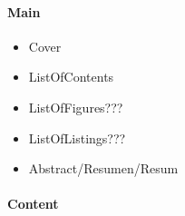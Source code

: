 \paragraph{Main}

\begin{itemize}
	\item Cover
	\item ListOfContents
	\item ListOfFigures???
	\item ListOfListings???
	\item Abstract/Resumen/Resum
\end{itemize} 

\paragraph{Content}

